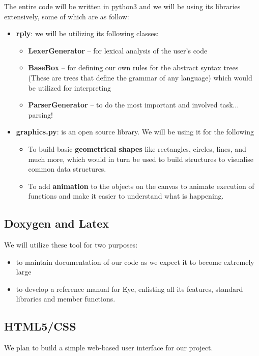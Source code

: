 \documentclass{article}
\begin{document}
The entire code will be written in python3 and we will be using its libraries extensively, some of which are as follow:
\begin{itemize}
\item {\bf rply}: we will be utilizing its following classes:

\begin{itemize}
\item {\bf LexerGenerator} – for lexical analysis of the user's code
\item {\bf BaseBox} – for defining our own rules for the abstract syntax trees (These are trees that define the grammar of any language) which would be utilized for interpreting
\item {\bf ParserGenerator} – to do the most important and involved task... parsing!

\end{itemize}

\item {\bf graphics.py}: is an open source library. We will be using it for the following
\begin{itemize}
\item To build basic {\bf geometrical shapes} like rectangles, circles, lines, and much more, which would in turn be used to build structures to visualise common data structures.
\item To add {\bf animation} to the objects on the canvas to animate execution of functions and make it easier to understand what is happening.
\end{itemize}
\end{itemize}

	
\subsection{Doxygen and Latex}We will utilize these tool for two purposes: 
\begin{itemize}
    \item to maintain documentation of our code as we expect it to become extremely large
    \item to develop a reference manual for Eye, enlisting all its features, standard libraries and member functions.
\end{itemize}

\subsection{HTML5/CSS}
We plan to build a simple web-based user interface for our project.
\end{document}
